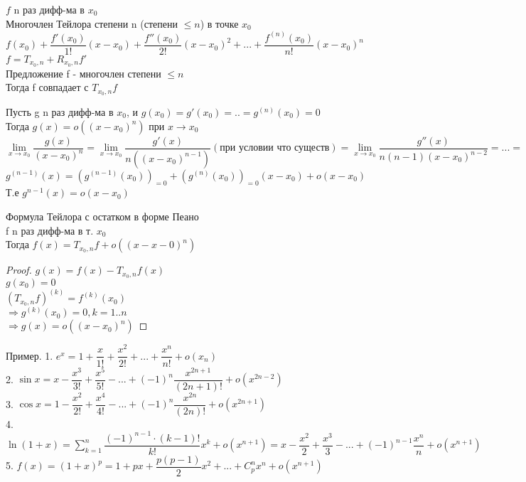 
$ f $ n раз дифф-ма в $x_0$ \\
Многочлен Тейлора степени n (степени $\leq n$) в точке $x_0$ \\
$ f(x_0) + \dfrac{f'(x_0)}{1!} (x - x_0) + \dfrac{f''(x_0)}{2!} (x-x_0)^2 + ... + \dfrac{f^{(n)} (x_0)}{n!} (x-x_0)^n $ \\
$ f = T_{x_0, n} + R_{x_0, n} f' $ \\
Предложение f - многочлен степени $ \leq n$ \\
Тогда f совпадает с $ T_{x_0, n} f $ \\

\begin{lemma}
	Пусть g n раз дифф-ма в $x_0$, и $ g(x_0) = g'(x_0) = .. = g^{(n)}(x_0) = 0 $ \\
	Тогда $ g(x) = o((x - x_0)^n) $ при $ x \rightarrow x_0 $ \\
	$ \lim\limits_{x \rightarrow x_0} \dfrac{g(x)}{(x-x_0)^n} = \lim\limits_{x \rightarrow x_0} \dfrac{g'(x)}{n((x-x_0)^{n-1})} (\text{при условии что существ}) = \lim\limits_{x \rightarrow x_0} \dfrac{g''(x)}{n(n-1)(x-x_0)^{n-2}} = ... = \lim\limits_{x \rightarrow x_0} \dfrac{g^{(n-1)}(x)}{n!(x-x_0)} $ \\
	$ g^{(n-1)} (x) = (g^{(n-1)} (x_0))_{=0} + (g^{(n)} (x_0))_{=0} (x - x_0) + o(x - x_0) $ \\
	Т.е $ g^{n-1} (x) = o(x-x_0) $  
\end{lemma}

\begin{theorem}
	Формула Тейлора с остатком в форме Пеано \\
	f n раз дифф-ма в т. $ x_0 $ \\
	Тогда $ f(x) = T_{x_0, n} f + o((x-x-0)^n) $ \\
	\begin{proof}
		$ g(x) = f(x) - T_{x_0, n} f(x) $ \\
		$ g(x_0) = 0 $ \\
		$ (T_{x_0,n} f)^{(k)} = f^{(k)} (x_0) $ \\
		$ \Rightarrow g^{(k)} (x_0) = 0 , k = 1..n $\\
		$ \Rightarrow g(x) = o((x - x_0)^n) $ 
	\end{proof}
\end{theorem}

Пример. 
1. $ e^x = 1 + \dfrac{x}{1!} + \dfrac{x^2}{2!} + ... + \dfrac{x^n}{n!} + o(x_n) $ \\
2. $ \sin x = x - \dfrac{x^3}{3!} + \dfrac{x^5}{5!} - ... + (-1)^n \dfrac{x^{2n+1}}{(2n+1)!} + o(x^{2n-2}) $ \\
3. $ \cos x = 1 - \dfrac{x^2}{2!} + \dfrac{x^4}{4!} - ... + (-1)^n \dfrac{x^{2n}}{(2n)!} + o(x^{2n+1}) $ \\
4. $ \ln (1+x) = \sum_{k=1}^{n} \dfrac{(-1)^{n-1} \cdot  (k-1)!}{k!} x^k + o(x^{n+1}) = x - \dfrac{x^2}{2} + \dfrac{x^3}{3} - ...+(-1)^{n-1} \dfrac{x^n}{n} + o(x^{n+1})$ \\
5. $f(x) = (1+x)^p = 1 + px + \dfrac{p(p-1)}{2} x^2 + ... + C^n_p x^n+ o(x^{n+1}) $ \\

